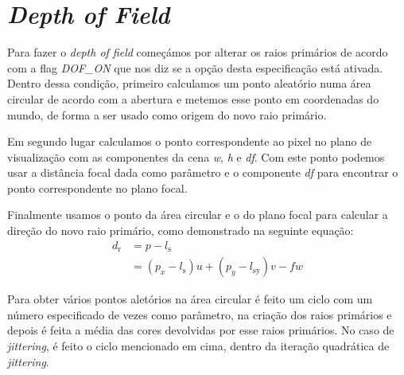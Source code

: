 \documentclass{article}
\begin{document}
        
    \section*{\textit{Depth of Field}}
        \par
        Para fazer o \textit{depth of field} começámos por alterar os raios primários de acordo com a flag \textit{DOF\_ON} que nos diz se a opção desta especificação está ativada. Dentro dessa condição, primeiro calculamos um ponto aleatório numa área circular de acordo com a abertura e metemos esse ponto em coordenadas do mundo, de forma a ser usado como origem do novo raio primário.
        \par
        Em segundo lugar calculamos o ponto correspondente ao pixel no plano de visualização com as componentes da cena \textit{w}, \textit{h} e \textit{df}. Com este ponto podemos usar a distância focal dada como parâmetro e o componente \textit{df} para encontrar o ponto correspondente no plano focal.
        \par
        Finalmente usamos o ponto da área circular e o do plano focal para calcular a direção do novo raio primário, como demonstrado na seguinte equação:
        \begin{equation*}
        \begin{aligned}
        d_{\mathrm{r}} &=p-l_{\mathrm{s}} \\ &=\left(p_{x}-l_{\mathrm{s}}\right) u+\left(p_{y}-l_{\mathrm{sy}}\right) v-f w 
        \end{aligned}
        \end{equation*}
        \par
        Para obter vários pontos aletórios na área circular é feito um ciclo com um número especificado de vezes como parâmetro, na criação dos raios primários e depois é feita a média das cores devolvidas por esse raios primários. No caso de \textit{jittering}, é feito o ciclo mencionado em cima, dentro da iteração quadrática de \textit{jittering}.
\end{document}
